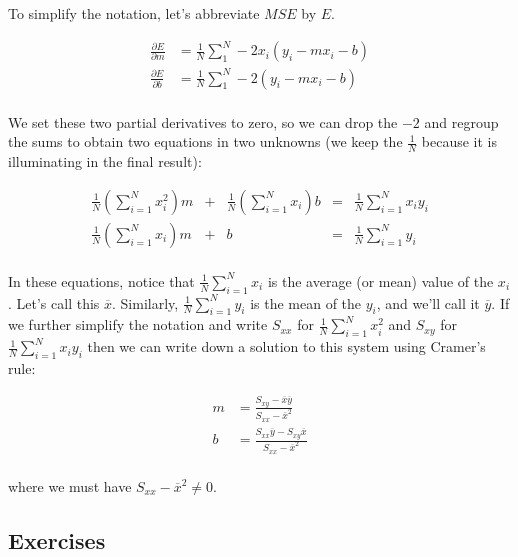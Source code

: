 \documentclass[
  oneside]{scrbook}
\begin{document}
To simplify the notation, let's abbreviate \(MSE\) by \(E\).

\[\begin{aligned} \frac{\partial E}{\partial m} &=
\frac{1}{N}\sum_{1}^{N}-2x_i(y_i-mx_i-b) \\ \frac{\partial E}{\partial
b} &= \frac{1}{N}\sum_{1}^{N}-2(y_i-mx_i-b) \\ \end{aligned} \]

We set these two partial derivatives to zero, so we can drop the \(-2\)
and regroup the sums to obtain two equations in two unknowns (we keep
the \(\frac{1}{N}\) because it is illuminating in the final result):

\begin{equation} \begin{aligned} \frac{1}{N}(\sum_{i=1}^{N} x_i^2)m &+&
\frac{1}{N}(\sum_{i=1}^{N} x_i)b &=& \frac{1}{N}\sum_{i=1}^{N} x_i y_i
\\ \frac{1}{N}(\sum_{i=1}^{N} x_i)m &+& b &=&
\frac{1}{N}\sum_{i=1}^{N} y_{i} \\ \end{aligned} \label{eq:LS}\end{equation}

In these equations, notice that \(\frac{1}{N}\sum_{i=1}^{N} x_i\) is the
average (or mean) value of the \(x_i\). Let's call this
\(\overline{x}\). Similarly, \(\frac{1}{N}\sum_{i=1}^{N} y_{i}\) is the
mean of the \(y_i\), and we'll call it \(\overline{y}\). If we further
simplify the notation and write \(S_{xx}\) for
\(\frac{1}{N}\sum_{i=1}^{N} x_i^2\) and \(S_{xy}\) for
\(\frac{1}{N}\sum_{i=1}^{N}x_iy_i\) then we can write down a solution to
this system using Cramer's rule:

\begin{equation} \begin{aligned} m &=
\frac{S_{xy}-\overline{x}\overline{y}}{S_{xx}-\overline{x}^2} \\ b &=
\frac{S_{xx}\overline{y}-S_{xy}\overline{x}}{S_{xx}-\overline{x}^2} \\
\end{aligned} \label{eq:LSAnswer}\end{equation}

where we must have \(S_{xx}-\overline{x}^2\not=0\).

\hypertarget{sec:CalcExercises}{%
\subsection{Exercises}\label{sec:CalcExercises}}
\end{document}
